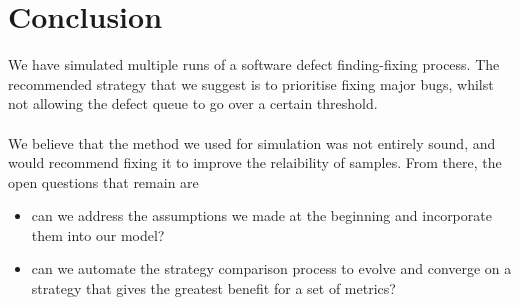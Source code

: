\section{Conclusion}

We have simulated multiple runs of a software defect finding-fixing process.
The recommended strategy that we suggest is to prioritise fixing major bugs,
whilst not allowing the defect queue to go over a certain threshold.\\
\\
We believe that the method we used for simulation was not entirely sound, and
would recommend fixing it to improve the relaibility of samples.
From there, the open questions that remain are
\begin{itemize}
  \item can we address the assumptions we made at the beginning and incorporate
  them into our model?
  \item can we automate the strategy comparison process to evolve and converge
  on a strategy that gives the greatest benefit for a set of metrics?
\end{itemize}

